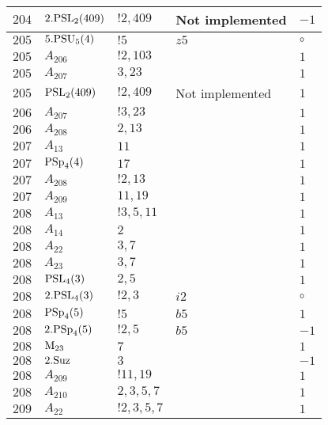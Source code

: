 \documentclass[a4paper, 11pt]{article}
\begin{document}
\begin{longtable}{lllll}
        $ 204 $ & $ 2.{\rm PSL}_{2}(409) $ & $ !2, 409 $ &  Not implemented & $ -1$ \\ \hline
        $ 205 $ & $ 5.{\rm PSU}_{5}(4) $ & $ ! 5 $ & $ z5 $ &  $\circ$ \\ \hline
        $ 205 $ & $ A_{206} $ & $ !2, 103 $ & $ ~ $ & $ 1$ \\ \hline
        $ 205 $ & $ A_{207} $ & $ 3, 23 $ & $ ~ $ & $ 1$ \\ \hline
        $ 205 $ & $ {\rm PSL}_{2}(409) $ & $ !2, 409 $ &  Not implemented & $ 1$ \\ \hline
        $ 206 $ & $ A_{207} $ & $ !3, 23 $ & $ ~ $ & $ 1$ \\ \hline
        $ 206 $ & $ A_{208} $ & $ 2, 13 $ & $ ~ $ & $ 1$ \\ \hline
        $ 207 $ & $ A_{13} $ & $ 11 $ & $ ~ $ & $ 1$ \\ \hline
        $ 207 $ & $ {\rm PSp}_{4}(4) $ & $ 17 $ & $ ~ $ & $ 1$ \\ \hline
        $ 207 $ & $ A_{208} $ & $ !2, 13 $ & $ ~ $ & $ 1$ \\ \hline
        $ 207 $ & $ A_{209} $ & $ 11, 19 $ & $ ~ $ & $ 1$ \\ \hline
        $ 208 $ & $ A_{13} $ & $ ! 3,5,11 $ & $ ~ $ & $ 1$ \\ \hline
        $ 208 $ & $ A_{14} $ & $ 2 $ & $ ~ $ & $ 1$ \\ \hline
        $ 208 $ & $ A_{22} $ & $ 3,7 $ & $ ~ $ & $ 1$ \\ \hline
        $ 208 $ & $ A_{23} $ & $ 3,7 $ & $ ~ $ & $ 1$ \\ \hline
        $ 208 $ & $ {\rm PSL}_{4}(3) $ & $ 2,5 $ & $ ~ $ & $ 1$ \\ \hline
        $ 208 $ & $ 2.{\rm PSL}_{4}(3) $ & $ ! 2,3 $ & $ i2 $ &  $\circ$ \\ \hline
        $ 208 $ & $ {\rm PSp}_{4}(5) $ & $ ! 5 $ & $ b5 $ & $ 1$ \\ \hline
        $ 208 $ & $ 2.{\rm PSp}_{4}(5) $ & $ ! 2,5 $ & $ b5 $ & $ -1$ \\ \hline
        $ 208 $ & $ {\rm M}_{23} $ & $ 7 $ & $ ~ $ & $ 1$ \\ \hline
        $ 208 $ & $ 2.{\rm Suz} $ & $ 3 $ & $ ~ $ & $ -1$ \\ \hline
        $ 208 $ & $ A_{209} $ & $ !11, 19 $ & $ ~ $ & $ 1$ \\ \hline
        $ 208 $ & $ A_{210} $ & $ 2, 3, 5, 7 $ & $ ~ $ & $ 1$ \\ \hline
        $ 209 $ & $ A_{22} $ & $ ! 2,3,5,7 $ & $ ~ $ & $ 1$ \\ \hline

\end{longtable}
\end{document}
